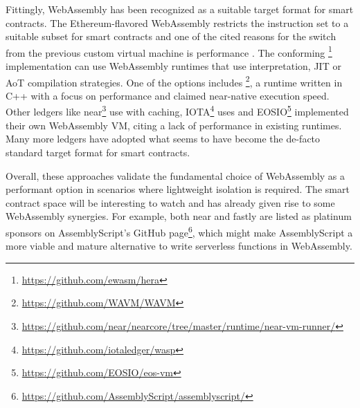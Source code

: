 Fittingly, WebAssembly has been recognized as a suitable target format for smart contracts. The Ethereum-flavored WebAssembly restricts the instruction set to a suitable subset for smart contracts and one of the cited reasons for the switch from the previous custom virtual machine is performance \cite{Ewasm2021}.
The conforming \footnote{\url{https://github.com/ewasm/hera}} implementation can use WebAssembly runtimes that use interpretation, JIT or AoT compilation strategies. One of the options includes \footnote{\url{https://github.com/WAVM/WAVM}}, a runtime written in C++ with a focus on performance and claimed near-native execution speed.
Other ledgers like near\footnote{\url{https://github.com/near/nearcore/tree/master/runtime/near-vm-runner/}} use  with caching, IOTA\footnote{\url{https://github.com/iotaledger/wasp}} uses  and EOSIO\footnote{\url{https://github.com/EOSIO/eos-vm}} implemented their own WebAssembly VM, citing a lack of performance in existing runtimes. Many more ledgers have adopted what seems to have become the de-facto standard target format for smart contracts.

Overall, these approaches validate the fundamental choice of WebAssembly as a performant option in scenarios where lightweight isolation is required. The smart contract space will be interesting to watch and has already given rise to some WebAssembly synergies. For example, both near and fastly are listed as platinum sponsors on AssemblyScript's GitHub page\footnote{\url{https://github.com/AssemblyScript/assemblyscript/}}, which might make AssemblyScript a more viable and mature alternative to write serverless functions in WebAssembly.
